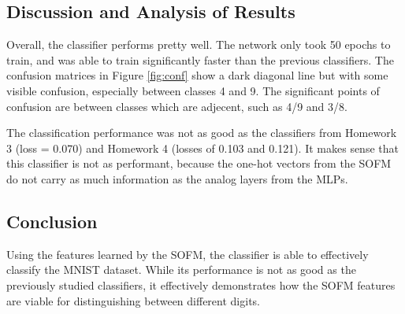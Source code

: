 \documentclass[a4paper, 12pt, titlepage]{article}
\newcommand{\figRef}[1]{Figure \ref{#1}}
\begin{document}
  \subsection{Discussion and Analysis of Results}
  \par Overall, the classifier performs pretty well.
  The network only took 50 epochs to train, and was able to train significantly
  faster than the previous classifiers.
  The confusion matrices in \figRef{fig:conf} show a dark diagonal line but
  with some visible confusion, especially between classes 4 and 9.
  The significant points of confusion are between classes which are adjecent,
  such as 4/9 and 3/8.
  \par The classification performance was not as good as the classifiers from
  Homework 3 (loss = 0.070) and Homework 4 (losses of 0.103 and 0.121).
  It makes sense that this classifier is not as performant, because the one-hot
  vectors from the SOFM do not carry as much information as the analog layers
  from the MLPs.

  \subsection{Conclusion}
  \par Using the features learned by the SOFM, the classifier is able to
  effectively classify the MNIST dataset.
  While its performance is not as good as the previously studied classifiers,
  it effectively demonstrates how the SOFM features are viable for
  distinguishing between different digits.
\end{document}
